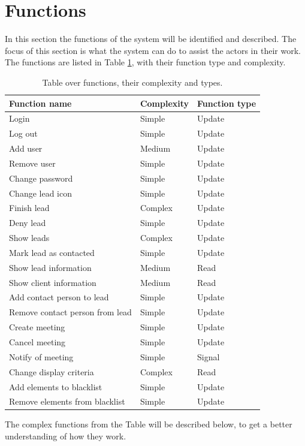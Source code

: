 \section{Functions}
In this section the functions of the system will be identified and described. The focus of this section is what the system can do to assist the actors in their work. The functions are listed in Table \ref{tab:functionTable}, with their function type and complexity.
\begin{table}[H]
\begin{tabular}{|l|l|l|}
\hline
\textbf{Function name}  & \textbf{Complexity} & \textbf{Function type} \\ \hline
Login                             & Simple     & Update        \\ \hline
Log out                           & Simple     & Update        \\ \hline
Add user                          & Medium     & Update        \\ \hline
Remove user                       & Simple     & Update        \\ \hline
Change password                   & Simple     & Update        \\ \hline
Change lead icon                  & Simple     & Update        \\ \hline
Finish lead                       & Complex    & Update        \\ \hline
Deny lead                         & Simple     & Update        \\ \hline
Show leads                        & Complex     & Update        \\ \hline
Mark lead as contacted            & Simple     & Update        \\ \hline
Show lead information             & Medium     & Read          \\ \hline
Show client information           & Medium     & Read          \\ \hline
Add contact person to lead        & Simple     & Update        \\ \hline
Remove contact person from lead   & Simple     & Update        \\ \hline
Create meeting                    & Simple     & Update        \\ \hline
Cancel meeting                    & Simple     & Update        \\ \hline
Notify of meeting                 & Simple     & Signal        \\ \hline
Change display criteria           & Complex    & Read          \\ \hline
Add elements to blacklist         & Simple     & Update        \\ \hline
Remove elements from blacklist    & Simple     & Update        \\ \hline
\end{tabular}
\caption{Table over functions, their complexity and types.}
\label{tab:functionTable}
\end{table}
\noindent
The complex functions from the Table will be described below, to get a better understanding of how they work. 

